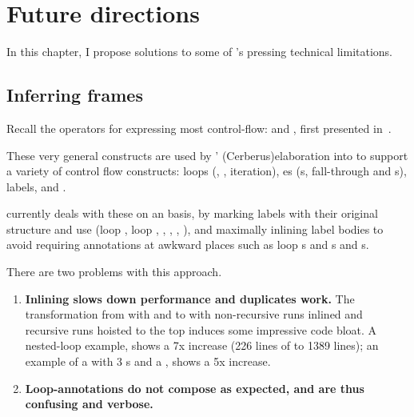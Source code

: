 
\chapter{Future directions}%
\label{chap:future-directions}

\margintoc{}

In this chapter, I propose solutions to some of 's pressing
technical limitations.

\section{Inferring frames}\label{sec:inferring-frames}

Recall the  operators for expressing most control-flow:
 and , first presented
in~.

These very general constructs are used by ' \kl(Cerberus){elaboration} into
 to support a variety of control flow constructs: loops (,
, iteration), es (s, fall-through and s), labels, and
.

 currently deals with these on an \adhoc{} basis, by marking
labels with their original structure and use (loop , loop ,
, , , ), and maximally inlining label bodies to
avoid requiring annotations at awkward places such as loop s and s
and  s.

There are two problems with this approach.

\begin{enumerate}
    \item \textbf{Inlining slows down performance and duplicates
        work.}
        The transformation from  with 
        and  to  with non-recursive runs
        inlined and recursive runs hoisted to the top induces some impressive
        code bloat. A nested-loop
        example,
        shows a 7x increase (226 lines of  to 1389 lines); an
        example of a
         with 3 s and a ,
        shows a 5x increase.
    \item \textbf{Loop-annotations do not compose as expected, and are thus confusing and
        verbose.}
\end{enumerate}

